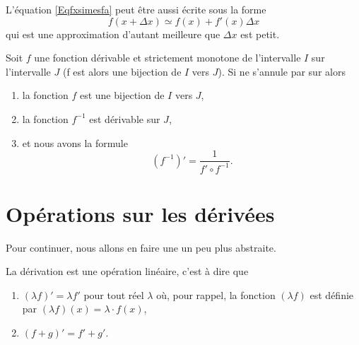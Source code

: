 L'équation \eqref{Eqfxsimesfa} peut être aussi écrite sous la forme
\begin{equation}		\label{EqfxdxSimeqfxfpx}
	f(x+\Delta x)\simeq f(x)+f'(x)\Delta x
\end{equation}
qui est une approximation d'autant meilleure que $\Delta x$ est petit.

\begin{proposition}      \label{PROPooSGTBooFxUuXK}
    Soit \(f \) une fonction dérivable et strictement monotone de l'intervalle \( I\) sur l'intervalle \( J\)  (f est alors une bijection de $I$ vers $J$). Si  ne s'annule par sur  alors 
    \begin{enumerate}
        \item
            la fonction \( f\) est une bijection de \( I\) vers \( J\),
        \item
            la fonction \( f^{-1}\) est dérivable sur \( J\),
        \item
            et nous avons la formule
            \begin{equation}        \label{EQooELIHooDxUFxH}
                (f^{-1})'=\frac{1}{ f'\circ f^{-1} }.               
            \end{equation}
    \end{enumerate}
\end{proposition}

\section{Opérations sur les dérivées}

Pour continuer, nous allons en faire une un peu plus abstraite.
\begin{proposition}     \label{PropDerrLin}
    La dérivation est une opération linéaire, c'est à dire que
    \begin{enumerate}
        \item $(\lambda f)'=\lambda f'$ pour tout réel $\lambda$ où, pour rappel, la fonction $(\lambda f)$ est définie par $(\lambda f)(x)=\lambda\cdot f(x)$,
        \item $(f+g)'=f'+g'$.
    \end{enumerate}
\end{proposition}

